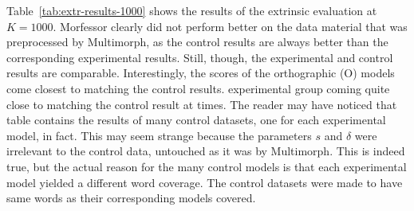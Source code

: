 {%
Table~\ref{tab:extr-results-1000} shows the results of the extrinsic evaluation at $K=1000$. 
Morfessor clearly did not perform 
	better on the data material that was preprocessed by Multimorph, as the control 
	results are always better than the corresponding 
	experimental results. Still, though, the experimental and control results are 
	comparable. Interestingly, the scores of the orthographic (O) models come closest to matching the control results.
	experimental group coming quite close to matching the control result at times. 
	The reader may have noticed that table contains the 
	results of many control datasets, one for each experimental model, in fact. This may seem strange 
	because the parameters $s$ and $\delta$ were irrelevant to the control data, untouched as it was 
	by Multimorph. This is indeed true, but the actual reason for the many control models is 
	that each experimental model yielded a different word coverage. The control datasets were made 
	to have same words as their corresponding models covered. 

}
